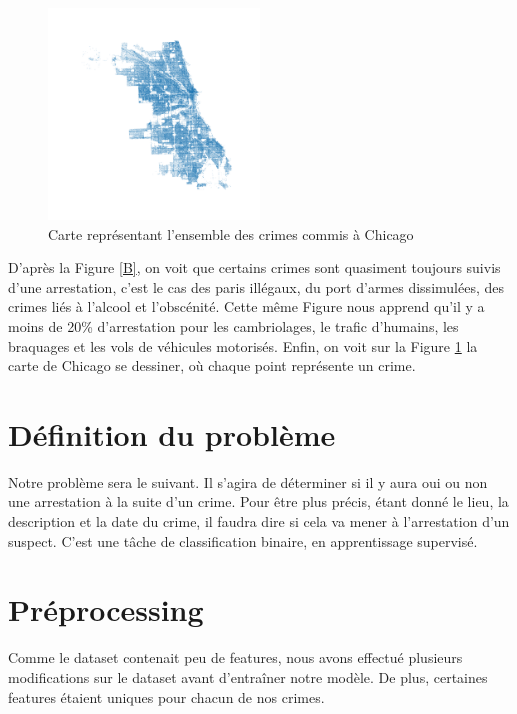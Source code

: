 \documentclass{article}
\begin{document}
    \begin{figure}
	    \centering
	    \includegraphics[width=0.5\textwidth]{images/carte_chicago.png}
	    \caption{Carte représentant l'ensemble des crimes commis à Chicago}
	    \label{C}
    \end{figure}

    D'après la Figure \ref{B}, on voit que certains crimes sont quasiment toujours suivis 
    d'une arrestation, c'est le cas des paris illégaux, du port d'armes dissimulées, 
    des crimes liés à l'alcool et l'obscénité.
    Cette même Figure nous apprend qu'il y a moins de 20\% d'arrestation pour les 
    cambriolages, le trafic d'humains, les braquages et les vols de véhicules motorisés.
    Enfin, on voit sur la Figure \ref{C} la carte de Chicago se dessiner, où chaque
    point représente un crime.

    \section{Définition du problème}
    Notre problème sera le suivant. Il s'agira de déterminer si il y aura
    oui ou non une arrestation à la suite d'un crime. 
    Pour être plus précis, étant donné le lieu, la description et la date du crime, 
    il faudra dire si cela va mener à l'arrestation d'un suspect.
    C'est une tâche de classification
    binaire, en apprentissage supervisé.

    \section{Préprocessing}
    Comme le dataset contenait peu de features, 
    nous avons effectué plusieurs modifications sur le dataset 
    avant d'entraîner notre modèle.
    De plus, certaines features étaient uniques pour chacun de nos crimes.
\end{document}
